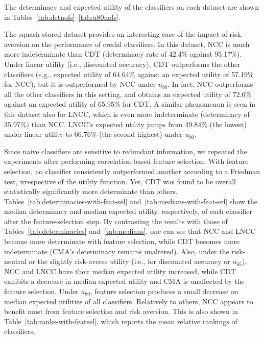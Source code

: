 \documentclass[a4paper,10pt,reqno]{amsart}
\theoremstyle{remark}
\begin{document}
The determinacy and expected utility of the classifiers on each dataset are shown in Tables~\ref{tab:detnofs}--\ref{tab:u80nofs}. 

The squash-stored dataset provides an interesting case of the impact of risk aversion on the performance of credal classifiers. In this dataset, NCC is much more indeterminate than CDT (determinacy rate of 42.4\% against 95.17\%). Under linear utility (i.e., discounted accuracy), CDT outperforms the other classifiers (e.g., expected utility of 64.64\% against an expected utility of 57.19\% for NCC), but it is outperformed by NCC under $u_{80}$. In fact, NCC outperforms all the other classifiers in this setting, and obtains an expected utility of 72.6\% against an expected utility of 65.95\% for CDT. A similar phenomenon is seen in this dataset also for LNCC, which is even more indeterminate (determinacy of 35.97\%) than NCC. LNCC's expected utility jumps from 49.84\% (the lowest) under linear utility to 66.76\% (the second highest) under $u_{80}$.

Since naive classifiers are sensitive to redundant information, we repeated the experiments after performing correlation-based feature selection. With feature selection, no classifier consistently outperformed another according to a Friedman test, irrespective of the utility function. Yet, CDT was found to be overall statistically significantly more determinate than others. %
Tables~\ref{tab:determinacies-with-feat-sel} and~\ref{tab:medians-with-feat-sel} show the median determinacy and median expected utility, respectively, of each classifier after the feature-selection step. By contrasting the results with those of Tables~\ref{tab:determinacies} and~\ref{tab:medians}, one can see that NCC and LNCC become more determinate with feature selection, while CDT becomes more indeterminate (CMA's determinacy remains unaltered). Also, under the risk-neutral or the slightly risk-averse utility (i.e., for discounted accuracy or $u_{65}$), NCC and LNCC have their median expected utility increased, while CDT exhibits a decrease in median expected utility and CMA is unaffected by the feature selection. Under $u_{80}$, feature selection produces a small decrease on median expected utilities of all classifiers. Relatively to others, NCC appears to benefit most from feature selection and risk aversion. This is also shown in Table~\ref{tab:ranks-with-featsel}, which reports the mean relative rankings of classifiers.
\end{document}
